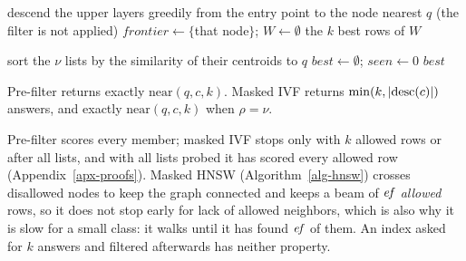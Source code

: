 \begin{algorithm}[t]
\caption{\textsc{Near}$(q,c,k)$: the auto rule}\label{alg-auto}
\small
{}
\eIf{$|\desc(c)|\le\theta$}{
  $R \gets$ the rows of the keys in the range scans $[(a,0,0),(b{+}1,0,0))$ for each $[a,b]\in I(c)$\;
  \Return the $k$ rows of $R$ with the largest $q\cdot\mathbf{v}$ \tcp*{pre-filter: exact}
}{
  \Return \textsc{MaskedHnsw}$(q,k,\ef,\;r\mapsto \po(r)\in I(c))$\;
}
\end{algorithm}

\begin{algorithm}[t]
\caption{\textsc{MaskedHnsw}$(q,k,\ef,\mathit{allowed})$}\label{alg-hnsw}
\small
descend the upper layers greedily from the entry point to the node nearest $q$ (the filter is not applied)\;
$\mathit{frontier} \gets \{$that node$\}$; $W \gets \emptyset$ 
\Return the $k$ best rows of $W$\;
\end{algorithm}

\begin{algorithm}[t]
\caption{Masked IVF: the $k$ best rows allowed by the class}\label{alg-ivf}
\small
sort the $\nu$ lists by the similarity of their centroids to $q$\;
$\mathit{best} \gets \emptyset$; $\mathit{seen} \gets 0$\;
\Return $\mathit{best}$\;
\end{algorithm}

\begin{lemma}\label{lem-exact}
Pre-filter returns exactly $\mathrm{near}(q,c,k)$. Masked IVF returns
$\min(k,|\mathrm{desc}(c)|)$ answers, and exactly $\mathrm{near}(q,c,k)$ when $\rho=\nu$.
\end{lemma}

\noindent
Pre-filter scores every member; masked IVF stops only with $k$ allowed rows or after
all lists, and with all lists probed it has scored every allowed row
(Appendix~\ref{apx-proofs}).
Masked HNSW (Algorithm~\ref{alg-hnsw}) crosses disallowed nodes to keep the graph
connected and keeps a beam of $\mathit{ef}$ \emph{allowed} rows, so it does not stop early for
lack of allowed neighbors, which is also why it is slow for a small class: it walks until
it has found $\mathit{ef}$ of them.
An index asked for $k$ answers and filtered afterwards has neither property.

